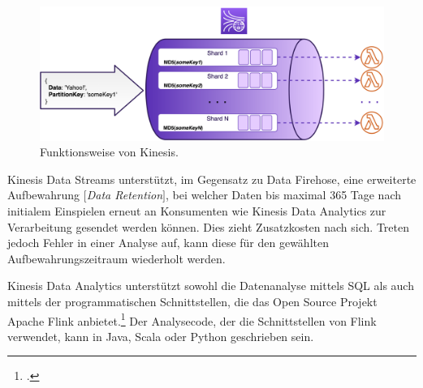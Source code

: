 \begin{figure}[H]
\centering
\includegraphics[width=\textwidth]{graphics/kinesis-inner-workings.png}
\caption[Funktionsweise von Kinesis]{Funktionsweise von Kinesis.\footnotemark}
\label{abb:KinesisShards}
\end{figure}

Kinesis Data Streams unterstützt, im Gegensatz zu Data Firehose, eine erweiterte Aufbewahrung $\lbrack$\textit{Data Retention}$\rbrack$, bei welcher Daten bis maximal 365 Tage nach initialem Einspielen erneut an Konsumenten wie Kinesis Data Analytics zur Verarbeitung gesendet werden können. Dies zieht Zusatzkosten nach sich. Treten jedoch Fehler in einer Analyse auf, kann diese für den gewählten Aufbewahrungszeitraum wiederholt werden.

Kinesis Data Analytics unterstützt sowohl die Datenanalyse mittels \ac{SQL} als auch mittels der programmatischen Schnittstellen, die das Open Source Projekt Apache Flink anbietet.\footcite[Vgl.][]{AmazonWebServicesInc..2020f} Der Analysecode, der die Schnittstellen von Flink verwendet, kann in Java, Scala oder Python geschrieben sein.

